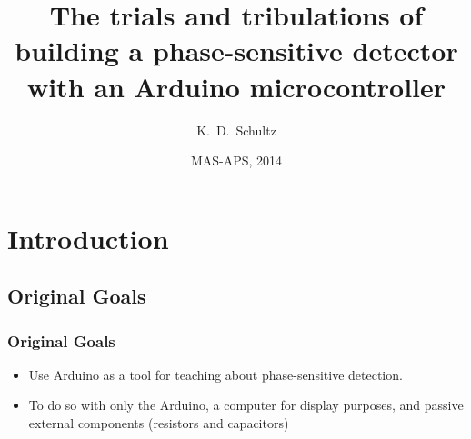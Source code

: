 \documentclass{beamer}
\title[PSD with Arduino CC-BY-SA.4.0] %
{The trials and tribulations of building a phase-sensitive detector with an Arduino microcontroller}
\author[K.\ D.\ Schultz] %
{K.~D.~Schultz}
\institute[Hartwick College] %
{
 
  Department of Physics\\
  Hartwick College
}
\date[MAS-APS] %
{MAS-APS, 2014}
\begin{document}
\begin{frame}
  \titlepage
\end{frame}






\section {Introduction}

\subsection{Original Goals}

\begin{frame}
\frametitle{Original Goals}

\begin{itemize}%
\item {Use Arduino as a tool for teaching about phase-sensitive detection.}
\item{To do so with only the Arduino, a computer for display purposes, and passive external components (resistors and capacitors)}

\end{itemize}
\end{frame}
\end{document}
